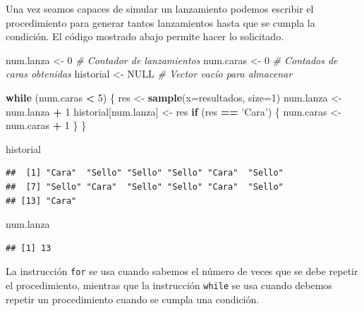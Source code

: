 \documentclass[10pt,]{krantz}
\makeatletter
\newenvironment{Shaded}{\begin{snugshade}}{\end{snugshade}}
\newcommand{\KeywordTok}[1]{\textcolor[rgb]{0.13,0.29,0.53}{\textbf{#1}}}
\newcommand{\DataTypeTok}[1]{\textcolor[rgb]{0.13,0.29,0.53}{#1}}
\newcommand{\DecValTok}[1]{\textcolor[rgb]{0.00,0.00,0.81}{#1}}
\newcommand{\StringTok}[1]{\textcolor[rgb]{0.31,0.60,0.02}{#1}}
\newcommand{\CommentTok}[1]{\textcolor[rgb]{0.56,0.35,0.01}{\textit{#1}}}
\newcommand{\OtherTok}[1]{\textcolor[rgb]{0.56,0.35,0.01}{#1}}
\newcommand{\ControlFlowTok}[1]{\textcolor[rgb]{0.13,0.29,0.53}{\textbf{#1}}}
\newcommand{\OperatorTok}[1]{\textcolor[rgb]{0.81,0.36,0.00}{\textbf{#1}}}
\newcommand{\NormalTok}[1]{#1}
\newenvironment{kframe}{%
\medskip{}
\setlength{\fboxsep}{.8em}
 \def\at@end@of@kframe{}%
 \ifinner\ifhmode%
  \def\at@end@of@kframe{\end{minipage}}%
  \begin{minipage}{\columnwidth}%
 \fi\fi%
 \def\FrameCommand##1{\hskip\@totalleftmargin \hskip-\fboxsep
 \colorbox{shadecolor}{##1}\hskip-\fboxsep
     \hskip-\linewidth \hskip-\@totalleftmargin \hskip\columnwidth}%
 \MakeFramed {\advance\hsize-\width
   \@totalleftmargin\z@ \linewidth\hsize
   \@setminipage}}%
 {\par\unskip\endMakeFramed%
 \at@end@of@kframe}
\renewenvironment{Shaded}{\begin{kframe}}{\end{kframe}}
\let\BeginKnitrBlock\begin \let\EndKnitrBlock\end
\makeatother
\begin{document}
Una vez seamos capaces de simular un lanzamiento podemos escribir el
procedimiento para generar tantos lanzamientos hasta que se cumpla la
condición. El código mostrado abajo permite hacer lo solicitado.

\begin{Shaded}
\begin{Highlighting}[]
\NormalTok{num.lanza <-}\StringTok{ }\DecValTok{0}     \CommentTok{# Contador de lanzamientos}
\NormalTok{num.caras <-}\StringTok{ }\DecValTok{0}     \CommentTok{# Contados de caras obtenidas}
\NormalTok{historial <-}\StringTok{ }\OtherTok{NULL}  \CommentTok{# Vector vacío para almacenar}

\ControlFlowTok{while}\NormalTok{ (num.caras }\OperatorTok{<}\StringTok{ }\DecValTok{5}\NormalTok{) \{}
\NormalTok{  res <-}\StringTok{ }\KeywordTok{sample}\NormalTok{(}\DataTypeTok{x=}\NormalTok{resultados, }\DataTypeTok{size=}\DecValTok{1}\NormalTok{)}
\NormalTok{  num.lanza <-}\StringTok{ }\NormalTok{num.lanza }\OperatorTok{+}\StringTok{ }\DecValTok{1}
\NormalTok{  historial[num.lanza] <-}\StringTok{ }\NormalTok{res}
  \ControlFlowTok{if}\NormalTok{ (res }\OperatorTok{==}\StringTok{ 'Cara'}\NormalTok{) \{}
\NormalTok{    num.caras <-}\StringTok{ }\NormalTok{num.caras }\OperatorTok{+}\StringTok{ }\DecValTok{1}
\NormalTok{  \}}
\NormalTok{\}}

\NormalTok{historial}
\end{Highlighting}
\end{Shaded}

\begin{verbatim}
##  [1] "Cara"  "Sello" "Sello" "Sello" "Cara"  "Sello"
##  [7] "Sello" "Cara"  "Sello" "Sello" "Cara"  "Sello"
## [13] "Cara"
\end{verbatim}

\begin{Shaded}
\begin{Highlighting}[]
\NormalTok{num.lanza}
\end{Highlighting}
\end{Shaded}

\begin{verbatim}
## [1] 13
\end{verbatim}

\BeginKnitrBlock{rmdnote}
La instrucción \texttt{for} se usa cuando sabemos el número de veces que
se debe repetir el procedimiento, mientras que la instrucción
\texttt{while} se usa cuando debemos repetir un procedimiento cuando se
cumpla una condición.
\EndKnitrBlock{rmdnote}
\end{document}
